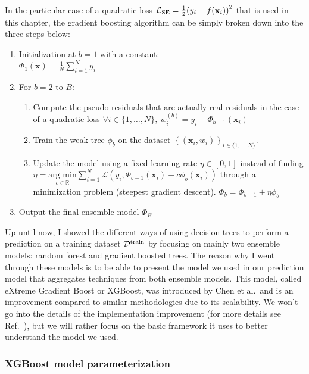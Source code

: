 \documentclass[main]{subfiles}
\begin{document}
In the particular case of a quadratic loss $\mathcal{L}_{\text{SE}} =\tfrac{1}{2} {\left(y_i - f(\mathbf{x}_i)\right)}^2$ that is used in this chapter, the gradient boosting algorithm can be simply broken down into the three steps below:\autocite{Friedman2002}
\begin{enumerate}
  \item Initialization at $b=1$ with a constant: \\
    \quad $\Phi_1(\mathbf{x}) = \frac{1}{N}\sum_{i=1}^{N}y_i$
  \item For $b = 2$ to $B$:
    \begin{enumerate}
      \item Compute the pseudo-residuals that are actually real residuals in the case of a quadratic loss
        \quad $\forall i\in \{1,\ldots,N\},\ w_i^{(b)} = y_i - \Phi_{b-1}(\mathbf{x}_i)$
      \item Train the weak tree $\phi_b$ on the dataset ${\left\{ (\mathbf{x}_i, w_i) \right\}}_{i\in \{1,\ldots,N\}}$.
      \item Update the model using a fixed learning rate $\eta\in [0,1]$ instead of finding $\eta =\underset{c\in \mathbb{R}}{\text{arg min}} \sum_{i=1}^{N}\mathcal{L}\left(y_i,\Phi_{b-1}(\mathbf{x}_i) + c \phi_b(\mathbf{x}_i)\right)$ through a minimization problem (steepest gradient descent).
        \quad $\Phi_b = \Phi_{b-1} + \eta \phi_{b}$
    \end{enumerate}
  \item Output the final ensemble model $\Phi_B$
\end{enumerate}

Up until now, I showed the different ways of using decision trees to perform a prediction on a training dataset $\mathcal{D}^{\text{train}}$ by focusing on mainly two ensemble models: random forest and gradient boosted trees. The reason why I went through these models is to be able to present the model we used in our prediction model that aggregates techniques from both ensemble models. This model, called eXtreme Gradient Boost or XGBoost, was introduced by Chen et al.\ and is an improvement compared to similar methodologies due to its scalability. We won't go into the details of the implementation improvement (for more details see Ref.~\cite{chen2016xgboost}), but we will rather focus on the basic framework it uses to better understand the model we used. 

\subsubsection{XGBoost model parameterization}
\end{document}
